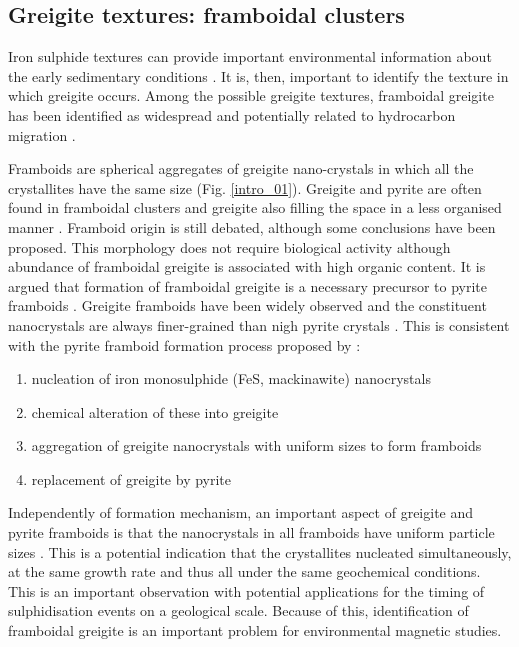 \subsection{Greigite textures: framboidal clusters}
Iron sulphide textures can provide important environmental information about the early sedimentary conditions \citep{Roberts2015}. It is, then, important to identify the texture in which greigite occurs. Among the possible greigite textures, framboidal greigite has been identified as widespread \citep{Ariztegui1996,Wilkin1997} and potentially related to hydrocarbon migration \citep{Aldana1999}.\par

Framboids are spherical aggregates of greigite nano-crystals in which all the crystallites have the same size (Fig. \ref{intro_01}). Greigite and pyrite are often found in framboidal clusters and greigite also filling the space in a less organised manner \citep{Wilkin1997,Roberts2005,Roberts2010,Rowan2006}. Framboid origin is still debated, although some conclusions have been proposed. This morphology does not require biological activity \citep{Sweeney1973,Wilkin1996} although abundance of framboidal greigite is associated with high organic content. It is argued that formation of framboidal greigite is a necessary precursor to pyrite framboids \citep{Sweeney1973,Wilkin1997}. Greigite framboids have been widely observed and the constituent nanocrystals are always finer-grained than nigh pyrite crystals \citep{Ariztegui1996,Roberts2005,Roberts2010,Rowan2006}. This is consistent with the pyrite framboid formation process proposed by \citet{Wilkin1997}:
\begin{enumerate}
\item nucleation of iron monosulphide (FeS, mackinawite) nanocrystals
\item chemical alteration of these into greigite
\item aggregation of greigite nanocrystals with uniform sizes to form framboids
\item replacement of greigite by pyrite
\end{enumerate}
Independently of formation mechanism, an important aspect of greigite and pyrite framboids is that the nanocrystals in all framboids have uniform particle sizes \citep{Wilkin1996}. This is a potential indication that the crystallites nucleated simultaneously, at the same growth rate and thus all under the same geochemical conditions. This is an important observation with potential applications for the timing of sulphidisation events on a geological scale. Because of this, identification of framboidal greigite is an important problem for environmental magnetic studies.\par

